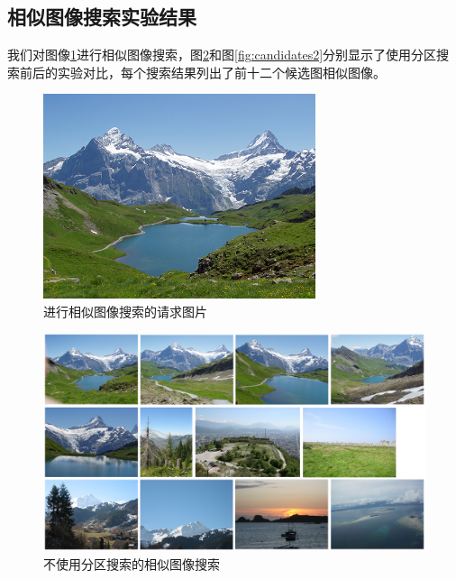 \subsection{相似图像搜索实验结果}
我们对图像\ref{fig:candi_query}进行相似图像搜索，图\ref{fig:candidates1}和图\ref{fig:candidates2}分别显示了使用分区搜索前后的实验对比，每个搜索结果列出了前十二个候选图相似图像。
\begin{figure}
\centering\includegraphics[width=8cm]{imgs/ch4/candi_query}
\caption{进行相似图像搜索的请求图片}
\label{fig:candi_query}
\end{figure}

\begin{figure}
\centering\includegraphics[width=15cm]{imgs/ch4/candidates1}
\caption{不使用分区搜索的相似图像搜索}
\label{fig:candidates1}
\end{figure}


